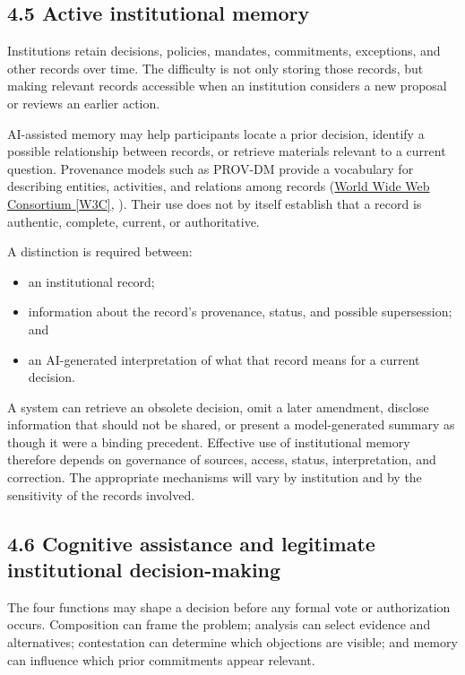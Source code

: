 \documentclass[
  10pt,
]{article}
\providecommand{\tightlist}{%
  \setlength{\itemsep}{0pt}\setlength{\parskip}{0pt}}
\newcommand{\axCite}[2]{\hyperlink{cite.#1}{#2}, \citeyear{#1}}
\begin{document}
\subsection{4.5 Active institutional
memory}\label{active-institutional-memory}

Institutions retain decisions, policies, mandates, commitments,
exceptions, and other records over time. The difficulty is not only
storing those records, but making relevant records accessible when an
institution considers a new proposal or reviews an earlier action.

AI-assisted memory may help participants locate a prior decision,
identify a possible relationship between records, or retrieve materials
relevant to a current question. Provenance models such as PROV-DM
provide a vocabulary for describing entities, activities, and relations
among records (\axCite{w3c2013provdm}{World Wide Web Consortium {[}W3C{]}}). Their use
does not by itself establish that a record is authentic, complete,
current, or authoritative.

A distinction is required between:

\begin{itemize}
\tightlist
\item
  an institutional record;
\item
  information about the record's provenance, status, and possible
  supersession; and
\item
  an AI-generated interpretation of what that record means for a current
  decision.
\end{itemize}

A system can retrieve an obsolete decision, omit a later amendment,
disclose information that should not be shared, or present a
model-generated summary as though it were a binding precedent. Effective
use of institutional memory therefore depends on governance of sources,
access, status, interpretation, and correction. The appropriate
mechanisms will vary by institution and by the sensitivity of the
records involved.

\subsection{4.6 Cognitive assistance and legitimate institutional
decision-making}\label{cognitive-assistance-and-legitimate-institutional-decision-making}

The four functions may shape a decision before any formal vote or
authorization occurs. Composition can frame the problem; analysis can
select evidence and alternatives; contestation can determine which
objections are visible; and memory can influence which prior commitments
appear relevant.
\end{document}
